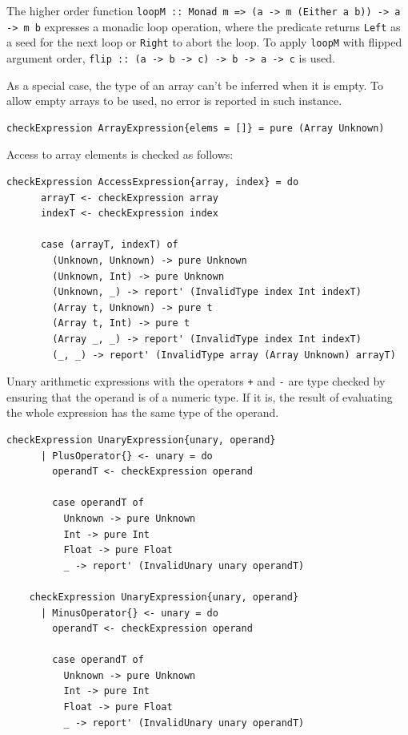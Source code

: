 \documentclass[UdineBachThesis,american,11pt]{PhdThesis}
\begin{document}
  The higher order function
  \mbox{\texttt{loopM :: Monad m => (a -> m (Either a b)) -> a -> m b}}
  expresses a monadic loop operation, where the predicate returns
  \mbox{\texttt{Left}} as a seed for the next loop or \mbox{\texttt{Right}} to
  abort the loop. To apply \mbox{\texttt{loopM}} with flipped argument order,
  \mbox{\texttt{flip :: (a -> b -> c) -> b -> a -> c}} is used.

  As a special case, the type of an array can't be inferred when it is empty. To
  allow empty arrays to be used, no error is reported in such instance.

  \begin{Verbatim}[gobble=4,fontsize=\small]
    checkExpression ArrayExpression{elems = []} = pure (Array Unknown)
  \end{Verbatim}

  Access to array elements is checked as follows:

  \begin{Verbatim}[gobble=4,fontsize=\small]
    checkExpression AccessExpression{array, index} = do
      arrayT <- checkExpression array
      indexT <- checkExpression index

      case (arrayT, indexT) of
        (Unknown, Unknown) -> pure Unknown
        (Unknown, Int) -> pure Unknown
        (Unknown, _) -> report' (InvalidType index Int indexT)
        (Array t, Unknown) -> pure t
        (Array t, Int) -> pure t
        (Array _, _) -> report' (InvalidType index Int indexT)
        (_, _) -> report' (InvalidType array (Array Unknown) arrayT)
  \end{Verbatim}

  Unary arithmetic expressions with the operators \texttt{+} and \texttt{-} are
  type checked by ensuring that the operand is of a numeric type. If it is, the
  result of evaluating the whole expression has the same type of the operand.

  \begin{Verbatim}[gobble=4,fontsize=\small]
    checkExpression UnaryExpression{unary, operand}
      | PlusOperator{} <- unary = do
        operandT <- checkExpression operand

        case operandT of
          Unknown -> pure Unknown
          Int -> pure Int
          Float -> pure Float
          _ -> report' (InvalidUnary unary operandT)

    checkExpression UnaryExpression{unary, operand}
      | MinusOperator{} <- unary = do
        operandT <- checkExpression operand

        case operandT of
          Unknown -> pure Unknown
          Int -> pure Int
          Float -> pure Float
          _ -> report' (InvalidUnary unary operandT)
  \end{Verbatim}
\end{document}
